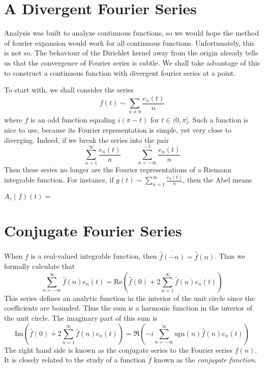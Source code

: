 \section{A Divergent Fourier Series}

Analysis was built to analyze continuous functions, so we would hope the method of fourier expansion would work for all continuous functions. Unfortunately, this is not so. The behaviour of the Dirichlet kernel away from the origin already tells us that the convergence of Fourier series is subtle. We shall take advantage of this to construct a continuous function with divergent fourier series at a point.

To start with, we shall consider the series
%
\[ f(t) \sim \sum_{n \neq 0} \frac{e_n(t)}{n} \]
%
where $f$ is an odd function equaling $i(\pi - t)$ for $t \in (0,\pi]$. Such a function is nice to use, because its Fourier representation is simple, yet very close to diverging. Indeed, if we break the series into the pair
%
\[ \sum_{n = 1}^\infty  \frac{e_n(t)}{n}\ \ \ \ \ \ \ \ \ \ \sum_{n = -\infty}^{-1} \frac{e_n(t)}{n} \]
%
Then these series no longer are the Fourier representations of a Riemann integrable function. For instance, if $g(t) \sim \sum_{n = 1}^\infty \frac{e_n(t)}{n}$, then the Abel means

$A_r(f)(t) = $

\section{Conjugate Fourier Series}

When $f$ is a real-valued integrable function, then $\overline{\widehat{f}(-n)} = \widehat{f}(n)$. Thus we formally calculate that
%
\[ \sum_{n = -\infty}^\infty \widehat{f}(n) e_n(t) = \text{Re} \left( \widehat{f}(0) + 2\sum_{n = 1}^\infty \widehat{f}(n) e_n(t) \right) \]
%
This series defines an analytic function in the interior of the unit circle since the coefficients are bounded. Thus the sum is a harmonic function in the interior of the unit circle. The imaginary part of this sum is
%
\[ \text{Im} \left( \widehat{f}(0) + 2\sum_{n = 1}^\infty \widehat{f}(n) e_n(t) \right) = \Re \left( -i \sum_{n = -\infty}^\infty \text{sgn}(n) \widehat{f}(n) e_n(t) \right) \]
%
The right hand side is known as the conjugate series to the Fourier series $\widehat{f}(n)$. It is closely related to the study of a function $\tilde{f}$ known as the {\it conjugate function}.







